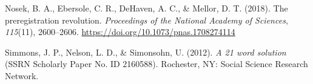 \documentclass[
  english,
  man,mask,floatsintext]{apa6}
\begin{document}
\leavevmode\hypertarget{ref-nosekPreregistrationRevolution2018}{}%
Nosek, B. A., Ebersole, C. R., DeHaven, A. C., \& Mellor, D. T. (2018). The preregistration revolution. \emph{Proceedings of the National Academy of Sciences}, \emph{115}(11), 2600--2606. \url{https://doi.org/10.1073/pnas.1708274114}

\leavevmode\hypertarget{ref-simmons21WordSolution2012}{}%
Simmons, J. P., Nelson, L. D., \& Simonsohn, U. (2012). \emph{A 21 word solution} (SSRN Scholarly Paper No. ID 2160588). Rochester, NY: Social Science Research Network.

\endgroup
\end{document}
